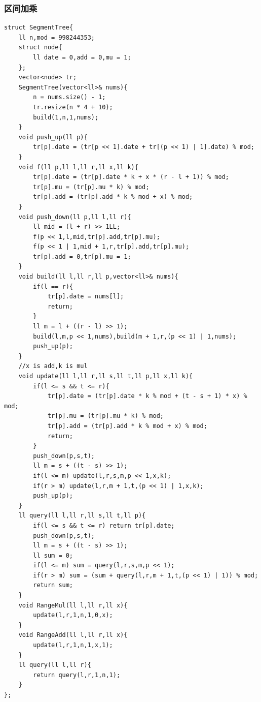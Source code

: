 \subsubsection{区间加乘}
\begin{lstlisting}[caption={}]
struct SegmentTree{
    ll n,mod = 998244353;
    struct node{
        ll date = 0,add = 0,mu = 1;
    };
    vector<node> tr;
    SegmentTree(vector<ll>& nums){
        n = nums.size() - 1;
        tr.resize(n * 4 + 10);
        build(1,n,1,nums);
    }
    void push_up(ll p){
        tr[p].date = (tr[p << 1].date + tr[(p << 1) | 1].date) % mod;
    }
    void f(ll p,ll l,ll r,ll x,ll k){
        tr[p].date = (tr[p].date * k + x * (r - l + 1)) % mod;
        tr[p].mu = (tr[p].mu * k) % mod;
        tr[p].add = (tr[p].add * k % mod + x) % mod;
    }
    void push_down(ll p,ll l,ll r){
        ll mid = (l + r) >> 1LL;
        f(p << 1,l,mid,tr[p].add,tr[p].mu);
        f(p << 1 | 1,mid + 1,r,tr[p].add,tr[p].mu);
        tr[p].add = 0,tr[p].mu = 1;
    }
    void build(ll l,ll r,ll p,vector<ll>& nums){
        if(l == r){
            tr[p].date = nums[l];
            return;
        }
        ll m = l + ((r - l) >> 1);
        build(l,m,p << 1,nums),build(m + 1,r,(p << 1) | 1,nums);
        push_up(p);
    }
    //x is add,k is mul
    void update(ll l,ll r,ll s,ll t,ll p,ll x,ll k){
        if(l <= s && t <= r){
            tr[p].date = (tr[p].date * k % mod + (t - s + 1) * x) % mod;
            tr[p].mu = (tr[p].mu * k) % mod;
            tr[p].add = (tr[p].add * k % mod + x) % mod;
            return;
        }
        push_down(p,s,t);
        ll m = s + ((t - s) >> 1);
        if(l <= m) update(l,r,s,m,p << 1,x,k);
        if(r > m) update(l,r,m + 1,t,(p << 1) | 1,x,k);
        push_up(p);
    }
    ll query(ll l,ll r,ll s,ll t,ll p){
        if(l <= s && t <= r) return tr[p].date;
        push_down(p,s,t);
        ll m = s + ((t - s) >> 1);
        ll sum = 0;
        if(l <= m) sum = query(l,r,s,m,p << 1);
        if(r > m) sum = (sum + query(l,r,m + 1,t,(p << 1) | 1)) % mod;
        return sum;
    }
    void RangeMul(ll l,ll r,ll x){
        update(l,r,1,n,1,0,x);
    }
    void RangeAdd(ll l,ll r,ll x){
        update(l,r,1,n,1,x,1);
    }
    ll query(ll l,ll r){
        return query(l,r,1,n,1);
    }
};
\end{lstlisting}


